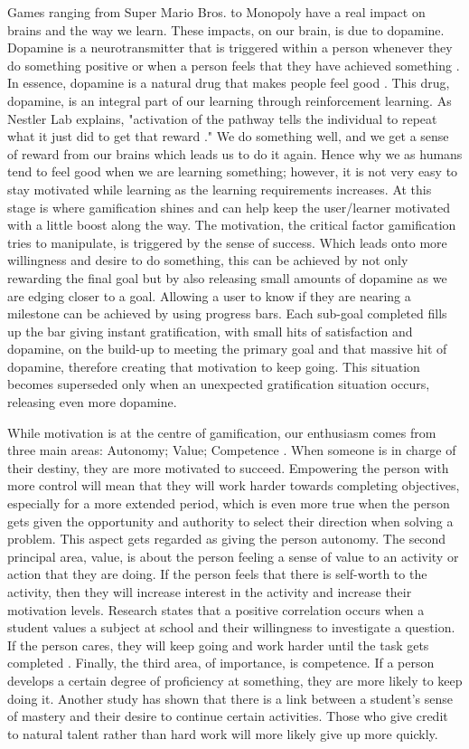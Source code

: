 \documentclass[sigchi]{acmart}
\begin{document}
Games ranging from Super Mario Bros. to Monopoly have a real impact on brains and the way we learn. These impacts, on our brain, is due to dopamine. Dopamine is a neurotransmitter that is triggered within a person whenever they do something positive or when a person feels that they have achieved something \cite{14}. In essence, dopamine is a natural drug that makes people feel good \cite{13}. This drug, dopamine, is an integral part of our learning through reinforcement learning. As Nestler Lab explains, "activation of the pathway tells the individual to repeat what it just did to get that reward \cite{13, 15}." We do something well, and we get a sense of reward from our brains which leads us to do it again. Hence why we as humans tend to feel good when we are learning something; however, it is not very easy to stay motivated while learning as the learning requirements increases. At this stage is where gamification shines and can help keep the user/learner motivated with a little boost along the way. The motivation, the critical factor gamification tries to manipulate, is triggered by the sense of success. Which leads onto more willingness and desire to do something, this can be achieved by not only rewarding the final goal but by also releasing small amounts of dopamine as we are edging closer to a goal. Allowing a user to know if they are nearing a milestone can be achieved by using progress bars. Each sub-goal completed fills up the bar giving instant gratification, with small hits of satisfaction and dopamine, on the build-up to meeting the primary goal and that massive hit of dopamine, therefore creating that motivation to keep going. This situation becomes superseded only when an unexpected gratification situation occurs, releasing even more dopamine. 

While motivation is at the centre of gamification, our enthusiasm comes from three main areas: Autonomy; Value; Competence \cite{16}. When someone is in charge of their destiny, they are more motivated to succeed. Empowering the person with more control will mean that they will work harder towards completing objectives, especially for a more extended period, which is even more true when the person gets given the opportunity and authority to select their direction when solving a problem. This aspect gets regarded as giving the person autonomy. The second principal area, value, is about the person feeling a sense of value to an activity or action that they are doing. If the person feels that there is self-worth to the activity, then they will increase interest in the activity and increase their motivation levels. Research states that a positive correlation occurs when a student values a subject at school and their willingness to investigate a question. If the person cares, they will keep going and work harder until the task gets completed \cite{12,16}. Finally, the third area, of importance, is competence. If a person develops a certain degree of proficiency at something, they are more likely to keep doing it. Another study has shown that there is a link between a student's sense of mastery and their desire to continue certain activities. Those who give credit to natural talent rather than hard work will more likely give up more quickly. 
\end{document}
